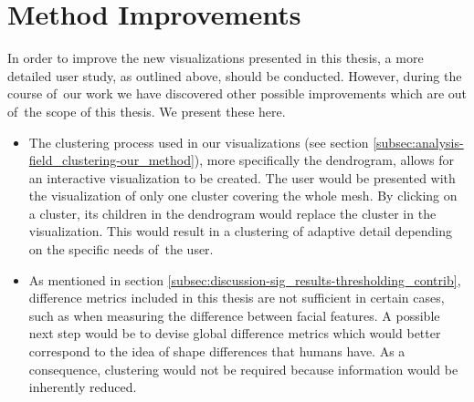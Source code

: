 \section{Method Improvements}
\label{sec:discussion-method_improvements}

In order to improve the new visualizations presented in this thesis, a more detailed user study, as outlined above, should be conducted. However, during the course of~our work we have discovered other possible improvements which are out of~the scope of this thesis. We present these here.

\begin{itemize}
	\item The clustering process used in our visualizations (see section \ref{subsec:analysis-field_clustering-our_method}), more specifically the dendrogram, allows for an interactive visualization to be created. The user would be presented with the visualization of only one cluster covering the whole mesh. By clicking on a cluster, its children in the dendrogram would replace the cluster in the visualization. This would result in a clustering of adaptive detail depending on the specific needs of~the user.
	\item As mentioned in section \ref{subsec:discussion-sig_results-thresholding_contrib}, difference metrics included in this thesis are not sufficient in certain cases, such as when measuring the difference between facial features. A possible next step would be to devise global difference metrics which would better correspond to the idea of shape differences that humans have. As a consequence, clustering would not be required because information would be inherently reduced.
\end{itemize}

